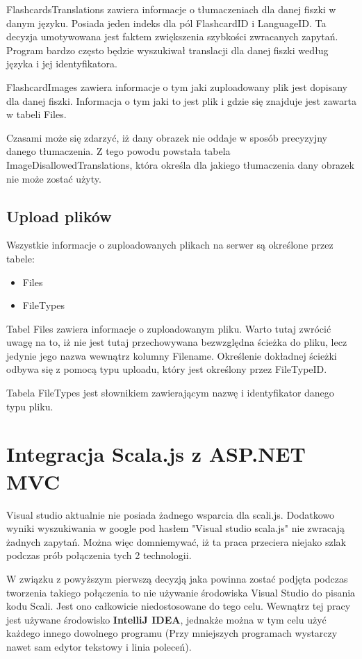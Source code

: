 FlashcardsTranslations zawiera informacje o tłumaczeniach dla danej fiszki w danym języku. Posiada jeden indeks dla pól FlashcardID i LanguageID. Ta decyzja umotywowana jest faktem zwiększenia szybkości zwracanych zapytań. Program bardzo często będzie wyszukiwał translacji dla danej fiszki według języka i jej identyfikatora.

FlashcardImages zawiera informacje o tym jaki zuploadowany plik jest dopisany dla danej fiszki. Informacja o tym jaki to jest plik i gdzie się znajduje jest zawarta w tabeli Files.

Czasami może się zdarzyć, iż dany obrazek nie oddaje w sposób precyzyjny danego tłumaczenia. Z tego powodu powstała tabela ImageDisallowedTranslations, która określa dla jakiego tłumaczenia dany obrazek nie może zostać użyty.

\subsection{Upload plików}
\label{subsec:uploadFiles}
Wszystkie informacje o zuploadowanych plikach na serwer są określone przez tabele:

\begin{itemize}
	\item Files
	\item FileTypes
\end{itemize}

Tabel Files zawiera informacje o zuploadowanym pliku. Warto tutaj zwrócić uwagę na to, iż nie jest tutaj przechowywana bezwzględna ścieżka do pliku, lecz jedynie jego nazwa wewnątrz kolumny Filename. Określenie dokładnej ścieżki odbywa się z pomocą typu uploadu, który jest określony przez FileTypeID.

Tabela FileTypes jest słownikiem zawierającym nazwę i identyfikator danego typu pliku.




\section{Integracja Scala.js z ASP.NET MVC}
 
Visual studio aktualnie nie posiada żadnego wsparcia dla scali.js\cite{ScalaNoSupport}. Dodatkowo wyniki wyszukiwania w google pod hasłem "Visual studio scala.js"\cite{ScalaNoSupportGoogle} nie zwracają żadnych zapytań. Można więc domniemywać, iż ta praca przeciera niejako szlak podczas prób połączenia tych 2 technologii.
 
W związku z powyższym pierwszą decyzją jaka powinna zostać podjęta podczas tworzenia takiego połączenia to nie używanie środowiska Visual Studio do pisania kodu Scali. Jest ono całkowicie niedostosowane do tego celu. Wewnątrz tej pracy jest używane środowisko \textbf{IntelliJ IDEA}, jednakże można w tym celu użyć każdego innego dowolnego programu (Przy mniejszych programach wystarczy nawet sam edytor tekstowy i linia poleceń).

